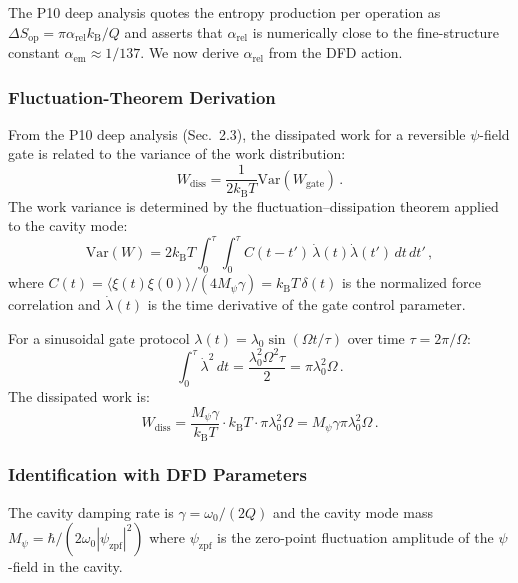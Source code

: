 \documentclass[11pt]{article}
\theoremstyle{definition}
\theoremstyle{remark}
\newcommand{\kB}{k_{\mathrm{B}}}
\begin{document}
The P10 deep analysis quotes the entropy production per operation as
$\Delta S_{\mathrm{op}} = \pi\alpha_{\mathrm{rel}}\kB/Q$ and asserts
that $\alpha_{\mathrm{rel}}$ is numerically close to the fine-structure
constant $\alpha_{\mathrm{em}} \approx 1/137$. We now derive $\alpha_{\mathrm{rel}}$
from the DFD action.

\subsubsection{Fluctuation-Theorem Derivation}

From the P10 deep analysis (Sec.~2.3), the dissipated work for a reversible
$\psi$-field gate is related to the variance of the work distribution:
\begin{equation}
W_{\mathrm{diss}} = \frac{1}{2\kB T}\mathrm{Var}(W_{\mathrm{gate}})\,.
\label{eq:wdiss-var}
\end{equation}
The work variance is determined by the fluctuation--dissipation theorem applied
to the cavity mode:
\begin{equation}
\mathrm{Var}(W) = 2\kB T \int_0^\tau \int_0^\tau
C(t-t')\,\dot\lambda(t)\dot\lambda(t')\,dt\,dt'\,,
\end{equation}
where $C(t) = \langle \xi(t)\xi(0)\rangle / (4M_\psi\gamma) = \kB T\,\delta(t)$
is the normalized force correlation and $\dot\lambda(t)$ is the time derivative
of the gate control parameter.

For a sinusoidal gate protocol $\lambda(t) = \lambda_0\sin(\Omega t/\tau)$
over time $\tau = 2\pi/\Omega$:
\begin{equation}
\int_0^\tau \dot\lambda^2\,dt = \frac{\lambda_0^2\Omega^2\tau}{2} =
\pi\lambda_0^2\Omega\,.
\end{equation}
The dissipated work is:
\begin{equation}
W_{\mathrm{diss}} = \frac{M_\psi\gamma}{\kB T} \cdot \kB T \cdot \pi\lambda_0^2\Omega
= M_\psi\gamma\pi\lambda_0^2\Omega\,.
\label{eq:wdiss-explicit}
\end{equation}

\subsubsection{Identification with DFD Parameters}

The cavity damping rate is $\gamma = \omega_0/(2Q)$ and the cavity mode mass
$M_\psi = \hbar/(2\omega_0 |\psi_{\mathrm{zpf}}|^2)$ where $\psi_{\mathrm{zpf}}$
is the zero-point fluctuation amplitude of the $\psi$-field in the cavity.
\end{document}

